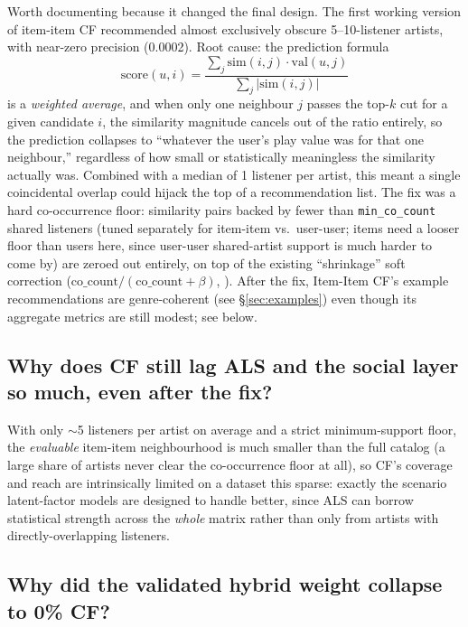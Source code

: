 \documentclass[11pt,a4paper]{article}
\newcommand{\code}[1]{\texttt{#1}}
\newcommand{\secref}[1]{\S\ref{#1}}
\begin{document}
Worth documenting because it changed the final design. The first working version of item-item CF recommended almost exclusively obscure 5--10-listener artists, with near-zero precision (0.0002). Root cause: the prediction formula
\begin{equation}
\text{score}(u,i) = \frac{\sum_j \text{sim}(i,j) \cdot \text{val}(u,j)}{\sum_j |\text{sim}(i,j)|}
\end{equation}
is a \emph{weighted average}, and when only one neighbour $j$ passes the top-$k$ cut for a given candidate $i$, the similarity magnitude cancels out of the ratio entirely, so the prediction collapses to ``whatever the user's play value was for that one neighbour,'' regardless of how small or statistically meaningless the similarity actually was. Combined with a median of 1 listener per artist, this meant a single coincidental overlap could hijack the top of a recommendation list. The fix was a hard co-occurrence floor: similarity pairs backed by fewer than \code{min\_co\_count} shared listeners (tuned separately for item-item vs.\ user-user; items need a looser floor than users here, since user-user shared-artist support is much harder to come by) are zeroed out entirely, on top of the existing ``shrinkage'' soft correction ($\text{co\_count}/(\text{co\_count}+\beta)$, \citealp{sarwar2001item}). After the fix, Item-Item CF's example recommendations are genre-coherent (see \secref{sec:examples}) even though its aggregate metrics are still modest; see below.

\subsection{Why does CF still lag ALS and the social layer so much, even after the fix?}

With only $\sim$5 listeners per artist on average and a strict minimum-support floor, the \emph{evaluable} item-item neighbourhood is much smaller than the full catalog (a large share of artists never clear the co-occurrence floor at all), so CF's coverage and reach are intrinsically limited on a dataset this sparse: exactly the scenario latent-factor models are designed to handle better, since ALS can borrow statistical strength across the \emph{whole} matrix rather than only from artists with directly-overlapping listeners.

\subsection{Why did the validated hybrid weight collapse to 0\% CF?}
\end{document}
